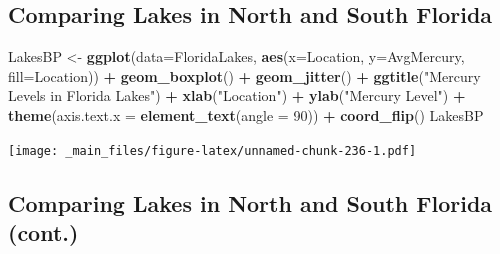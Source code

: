 \documentclass[]{book}
\newenvironment{Shaded}{\begin{snugshade}}{\end{snugshade}}
\newcommand{\KeywordTok}[1]{\textcolor[rgb]{0.13,0.29,0.53}{\textbf{#1}}}
\newcommand{\DataTypeTok}[1]{\textcolor[rgb]{0.13,0.29,0.53}{#1}}
\newcommand{\DecValTok}[1]{\textcolor[rgb]{0.00,0.00,0.81}{#1}}
\newcommand{\StringTok}[1]{\textcolor[rgb]{0.31,0.60,0.02}{#1}}
\newcommand{\OperatorTok}[1]{\textcolor[rgb]{0.81,0.36,0.00}{\textbf{#1}}}
\newcommand{\NormalTok}[1]{#1}
\begin{document}
\subsection{Comparing Lakes in North and South
Florida}\label{comparing-lakes-in-north-and-south-florida}

\begin{Shaded}
\begin{Highlighting}[]
\NormalTok{LakesBP <-}\StringTok{ }\KeywordTok{ggplot}\NormalTok{(}\DataTypeTok{data=}\NormalTok{FloridaLakes, }\KeywordTok{aes}\NormalTok{(}\DataTypeTok{x=}\NormalTok{Location, }\DataTypeTok{y=}\NormalTok{AvgMercury, }\DataTypeTok{fill=}\NormalTok{Location)) }\OperatorTok{+}\StringTok{ }
\StringTok{  }\KeywordTok{geom_boxplot}\NormalTok{() }\OperatorTok{+}\StringTok{   }\KeywordTok{geom_jitter}\NormalTok{() }\OperatorTok{+}\StringTok{ }\KeywordTok{ggtitle}\NormalTok{(}\StringTok{"Mercury Levels in Florida Lakes"}\NormalTok{) }\OperatorTok{+}\StringTok{ }
\StringTok{  }\KeywordTok{xlab}\NormalTok{(}\StringTok{"Location"}\NormalTok{) }\OperatorTok{+}\StringTok{ }\KeywordTok{ylab}\NormalTok{(}\StringTok{"Mercury Level"}\NormalTok{) }\OperatorTok{+}\StringTok{ }\KeywordTok{theme}\NormalTok{(}\DataTypeTok{axis.text.x =} \KeywordTok{element_text}\NormalTok{(}\DataTypeTok{angle =} \DecValTok{90}\NormalTok{)) }\OperatorTok{+}\StringTok{ }\KeywordTok{coord_flip}\NormalTok{()}
\NormalTok{LakesBP}
\end{Highlighting}
\end{Shaded}

\texttt{[image: \_main\_files/figure-latex/unnamed-chunk-236-1.pdf]}

\subsection{Comparing Lakes in North and South Florida
(cont.)}\label{comparing-lakes-in-north-and-south-florida-cont.}

\begin{Shaded}
\end{Shaded}
\end{document}
